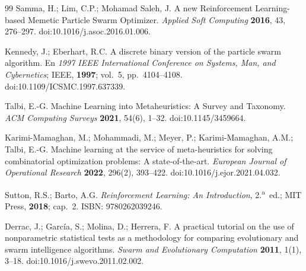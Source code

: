 \documentclass[10pt,a4paper]{article}
\begin{document}
\begin{thebibliography}{99}
 Samma, H.; Lim, C.P.; Mohamad Saleh, J. A new Reinforcement Learning-based
Memetic Particle Swarm Optimizer. \emph{Applied Soft Computing} \textbf{2016}, 43, 276--297.
doi:10.1016/j.asoc.2016.01.006.

 Kennedy, J.; Eberhart, R.C. A discrete binary version of the particle swarm
algorithm. En \emph{1997 IEEE International Conference on Systems, Man, and Cybernetics}; IEEE,
\textbf{1997}; vol.~5, pp.~4104--4108. doi:10.1109/ICSMC.1997.637339.

 Talbi, E.-G. Machine Learning into Metaheuristics: A Survey and Taxonomy.
\emph{ACM Computing Surveys} \textbf{2021}, 54(6), 1--32. doi:10.1145/3459664.

 Karimi-Mamaghan, M.; Mohammadi, M.; Meyer, P.; Karimi-Mamaghan, A.M.;
Talbi, E.-G. Machine learning at the service of meta-heuristics for solving combinatorial
optimization problems: A state-of-the-art. \emph{European Journal of Operational Research}
\textbf{2022}, 296(2), 393--422. doi:10.1016/j.ejor.2021.04.032.

 Sutton, R.S.; Barto, A.G. \emph{Reinforcement Learning: An Introduction},
2.\textsuperscript{a}~ed.; MIT Press, \textbf{2018}; cap.~2. ISBN: 9780262039246.

 Derrac, J.; García, S.; Molina, D.; Herrera, F. A practical tutorial on the use
of nonparametric statistical tests as a methodology for comparing evolutionary and swarm
intelligence algorithms. \emph{Swarm and Evolutionary Computation} \textbf{2011}, 1(1), 3--18.
doi:10.1016/j.swevo.2011.02.002.

\end{thebibliography}
\end{document}
